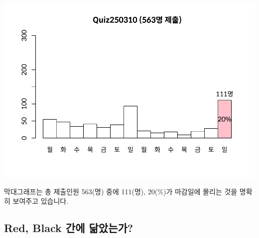 \documentclass[
]{book}
\begin{document}
\includegraphics{_main_files/figure-latex/unnamed-chunk-52-1.pdf}

막대그래프는 총 제출인원 563(명) 중에 111(명), 20(\%)가 마감일에 몰리는 것을 명확히 보여주고 있습니다.

\subsection{Red, Black 간에 닮았는가?}\label{red-black-uxac04uxc5d0-uxb2eeuxc558uxb294uxac00-1}
\end{document}
